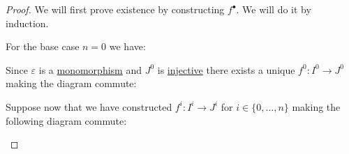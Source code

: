 \documentclass[../../main]{subfiles}
\begin{document}
\begin{proof}
  We will first prove existence by constructing \(f^{\bullet}\). We will do it by induction.

  For the base case \(n = 0\) we have:
  \begin{center}
  \end{center}
  Since \(\varepsilon\) is a \hyperref[def:mono-epi-morphism]{monomorphism} and \(J^{0}\) is \hyperref[def:injective-projective-object]{injective} there exists a unique \(f^{0}\colon I^{0} \to J^{0}\) making the diagram commute:
  \begin{center}
  \end{center}

  Suppose now that we have constructed \(f^{i}\colon I^{i} \to J^{i}\) for \(i \in \{0, \ldots, n\}\) making the following diagram commute:
   \begin{center}
  \end{center}


\end{proof}
\end{document}
